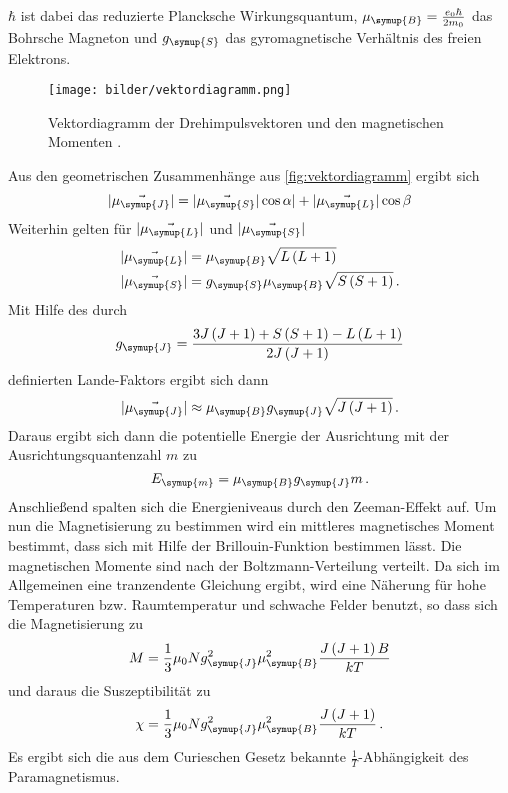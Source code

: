 $\hbar$ ist dabei das reduzierte Plancksche Wirkungsquantum, $\mu_{\symup{B}}=\frac{e_{0}\hbar}{2m_{0}}$ das
Bohrsche Magneton und $g_{\symup{S}}$ das gyromagnetische Verhältnis des freien Elektrons.
\begin{figure}
    \centering
    \texttt{[image: bilder/vektordiagramm.png]}
    \caption{Vektordiagramm der Drehimpulsvektoren und den magnetischen Momenten \cite{sample}.}
    \label{fig:vektordiagramm}
\end{figure}
Aus den geometrischen Zusammenhänge aus \autoref{fig:vektordiagramm} ergibt sich
\begin{equation*}
    |\vec{\mu_{\symup{J}}}| = |\vec{\mu_{\symup{S}}}|\cos{\alpha}| + |\vec{\mu_{\symup{L}}}|\cos{\beta}
\end{equation*}
Weiterhin gelten für $|\vec{\mu_{\symup{L}}}|$ und $|\vec{\mu_{\symup{S}}}|$
\begin{align*}
    |\vec{\mu_{\symup{L}}}| &= \mu_{\symup{B}}\sqrt{L\left(L+1\right)} \\
    |\vec{\mu_{\symup{S}}}| &= g_{\symup{S}}\mu_{\symup{B}}\sqrt{S\left(S+1\right)}\,.
\end{align*}
Mit Hilfe des durch
\begin{equation*}
    g_{\symup{J}} = \frac{3J\left(J+1\right) + S\left(S+1\right)- L\left(L+1\right)}{2J\left(J+1\right)}
\end{equation*}
definierten Lande-Faktors ergibt sich dann
\begin{equation*}
    |\vec{\mu_{\symup{J}}}| \approx \mu_{\symup{B}}g_{\symup{J}}\sqrt{J\left(J+1\right)}\,.
\end{equation*}
Daraus ergibt sich dann die potentielle Energie der Ausrichtung mit der Ausrichtungsquantenzahl $m$ zu
\begin{equation}
    E_{\symup{m}} = \mu_{\symup{B}}g_{\symup{J}}m\,.
\end{equation}
Anschließend spalten sich die Energieniveaus durch den Zeeman-Effekt auf. Um nun die Magnetisierung zu bestimmen
wird ein mittleres magnetisches Moment bestimmt, dass sich mit Hilfe der Brillouin-Funktion bestimmen lässt.
Die magnetischen Momente sind nach der Boltzmann-Verteilung verteilt. Da sich im Allgemeinen eine tranzendente
Gleichung ergibt, wird eine Näherung für hohe Temperaturen bzw. Raumtemperatur und schwache Felder benutzt,
so dass sich die Magnetisierung zu
\begin{equation*}
    M = \frac{1}{3}\mu_{0}Ng^{2}_{\symup{J}}\mu^2_{\symup{B}}\frac{J\left(J+1\right)B}{kT}
\end{equation*}
und daraus die Suszeptibilität zu
\begin{equation}
    \label{eqn:chi}
    \chi = \frac{1}{3}\mu_{0}Ng^{2}_{\symup{J}}\mu^2_{\symup{B}}\frac{J\left(J+1\right)}{kT}\,.
\end{equation}
Es ergibt sich die aus dem Curieschen Gesetz bekannte $\frac{1}{T}$-Abhängigkeit des Paramagnetismus.

